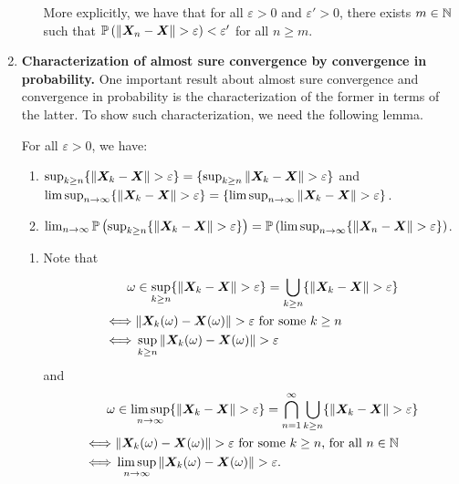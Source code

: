 \begin{enumerate}
\begin{itemize}
\begin{note}
More explicitly, we have that for all \(\varepsilon>0\) and \(\varepsilon'>0\),
there exists \(m\in\mathbb{N}\) such that
\(\prob{\|\vect{X}_{n}-\vect{X}\|>\varepsilon}<\varepsilon'\) for all \(n\ge
m\).
\end{note}
\end{itemize}
\item \textbf{Characterization of almost sure convergence by convergence in probability.}
One important result about almost sure convergence and convergence in
probability is the characterization of the former in terms of the latter. To
show such characterization, we need the following lemma.
\begin{lemma}
\label{lma:interchange-limsup}
For all \(\varepsilon>0\), we have:
\begin{enumerate}
\item \(\sup_{k\ge n}\{\|\vect{X}_k-\vect{X}\|>\varepsilon\}
=\{\sup_{k\ge n}\|\vect{X}_k-\vect{X}\|>\varepsilon\}
\) and
\(\limsup_{n\to\infty}\{\|\vect{X}_k-\vect{X}\|>\varepsilon\}
=\{\limsup_{n\to\infty}\|\vect{X}_k-\vect{X}\|>\varepsilon\}
\).
\item \(\lim_{n\to\infty}\prob{\sup_{k\ge n}\{\|\vect{X}_k-\vect{X}\|>\varepsilon\}}
=\prob{\limsup_{n\to\infty}\{\|\vect{X}_n-\vect{X}\|>\varepsilon\}}
\).
\end{enumerate}
\end{lemma}
\begin{pf}
\begin{enumerate}
\item Note that
\begin{align*}
\omega&\in\sup_{k\ge n}\{\|\vect{X}_k-\vect{X}\|>\varepsilon\}
=\bigcup_{k\ge n}^{}\{\|\vect{X}_k-\vect{X}\|>\varepsilon\} \\
\iff&\|\vect{X}_k(\omega)-\vect{X}(\omega)\|>\varepsilon\text{ for some \(k\ge n\)} \\
\iff&\sup_{k\ge n}\|\vect{X}_k(\omega)-\vect{X}(\omega)\|>\varepsilon
\end{align*}
and
\begin{align*}
\omega&\in\limsup_{n\to\infty}\{\|\vect{X}_k-\vect{X}\|>\varepsilon\}
=\bigcap_{n=1}^{\infty}\bigcup_{k\ge n}^{}\{\|\vect{X}_k-\vect{X}\|>\varepsilon\} \\
\iff&\|\vect{X}_k(\omega)-\vect{X}(\omega)\|>\varepsilon\text{ for some \(k\ge n\), for all \(n\in\N\)} \\
\iff&\limsup_{n\to\infty}\|\vect{X}_k(\omega)-\vect{X}(\omega)\|>\varepsilon.

\end{align*}
\end{enumerate}
\end{pf}
\end{enumerate}

